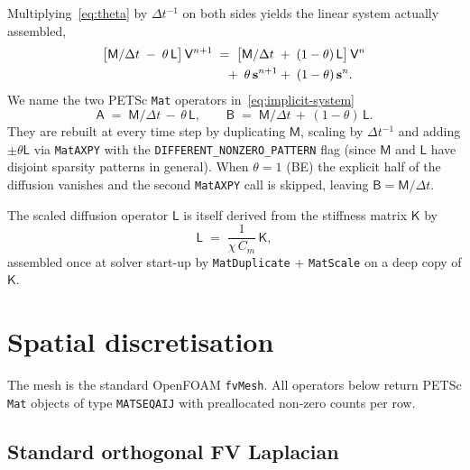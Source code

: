 \documentclass[11pt,a4paper]{article}
\newcommand{\Aimp}{\mathsf{A}}
\newcommand{\Bimp}{\mathsf{B}}
\newcommand{\Mmass}{\mathsf{M}}
\newcommand{\Kstif}{\mathsf{K}}
\newcommand{\Lop}{\mathsf{L}}
\newcommand{\code}[1]{\texttt{\small #1}}
\begin{document}
Multiplying~\eqref{eq:theta} by $\Delta t^{-1}$ on both sides yields the
linear system actually assembled,
\begin{align}
  \bigl[\Mmass/\Delta t \;-\; \theta\, \Lop\bigr]\, \mathsf{V}^{n+1}
  &\;=\;
  \bigl[\Mmass/\Delta t \;+\; (1-\theta)\, \Lop\bigr]\, \mathsf{V}^{n} \notag\\
  &\quad+\; \theta\, \mathbf{s}^{n+1}
        +\; (1-\theta)\, \mathbf{s}^{n}.
   \label{eq:implicit-system}
\end{align}
We name the two PETSc \code{Mat} operators in~\eqref{eq:implicit-system}
\begin{equation}
  \Aimp \;=\; \Mmass/\Delta t \,-\, \theta\, \Lop,
   \qquad
  \Bimp \;=\; \Mmass/\Delta t \,+\, (1-\theta)\, \Lop.
   \label{eq:AB}
\end{equation}
They are rebuilt at every time step by duplicating $\Mmass$, scaling by
$\Delta t^{-1}$ and adding $\pm \theta \Lop$ via \code{MatAXPY} with the
\code{DIFFERENT\_NONZERO\_PATTERN} flag (since $\Mmass$ and $\Lop$ have
disjoint sparsity patterns in general). When $\theta = 1$ (BE) the
explicit half of the diffusion vanishes and the second \code{MatAXPY}
call is skipped, leaving $\Bimp = \Mmass/\Delta t$.

The scaled diffusion operator $\Lop$ is itself derived from the
stiffness matrix $\Kstif$ by
\begin{equation}
  \Lop \;=\; \frac{1}{\chi\, C_{m}}\, \Kstif,
\end{equation}
assembled once at solver start-up by \code{MatDuplicate} +
\code{MatScale} on a deep copy of $\Kstif$.

\section{Spatial discretisation}

The mesh is the standard OpenFOAM \code{fvMesh}. All operators below
return PETSc \code{Mat} objects of type \code{MATSEQAIJ} with
preallocated non-zero counts per row.

\subsection{Standard orthogonal FV Laplacian}
\end{document}
